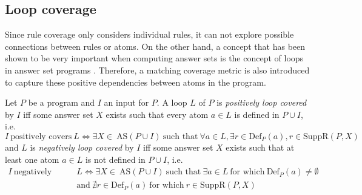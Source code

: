 \subsection{Loop coverage}
\label{subsec:Coverage metrics/Branch-like coverage/Loop coverage}
Since rule coverage only considers individual rules, it can not explore possible connections between rules or atoms. On the other hand, a concept that has been shown to be very important when computing answer sets is the concept of loops in answer set programs \cite{LZ04}. Therefore, a matching coverage metric is also introduced to capture these positive dependencies between atoms in the program.

\begin{definition}
\label{def:loop coverage}
    Let $P$ be a program and $I$ an input for $P$. A loop $L$ of $P$ is \emph{positively loop covered} by $I$ iff some answer set $X$ exists such that every atom \(a \in L\) is defined in \(P \cup I\), i.e.
    \[
        I\ \text{positively covers}\ L \Longleftrightarrow \exists X \in\ \text{AS}(P \cup I)\ \text{such that}\ \forall a \in L, \exists r \in \text{Def}_P(a), r \in \text{SuppR}(P,X)
    \]
    and $L$ is \emph{negatively loop covered} by $I$ iff some answer set $X$ exists such that at least one atom \(a \in L\) is not defined in \(P \cup I\), i.e.
    \begin{align*}
        I\ \text{negatively covers}\ &L \Longleftrightarrow \exists X \in\ \text{AS}(P \cup I)\ \text{such that}\ \exists a \in L\ \text{for which}\ \text{Def}_P(a) \neq \emptyset \\ 
        &\text{and}\ \nexists r \in \text{Def}_P(a)\ \text{for which}\ r \in \text{SuppR}(P,X)
    \end{align*}
\end{definition}

